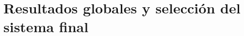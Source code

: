 \documentclass[../MAIN.tex]{subfiles}
\begin{document}
	
	
	\section{Resultados globales y selección del sistema final}
	
	
\end{document}

